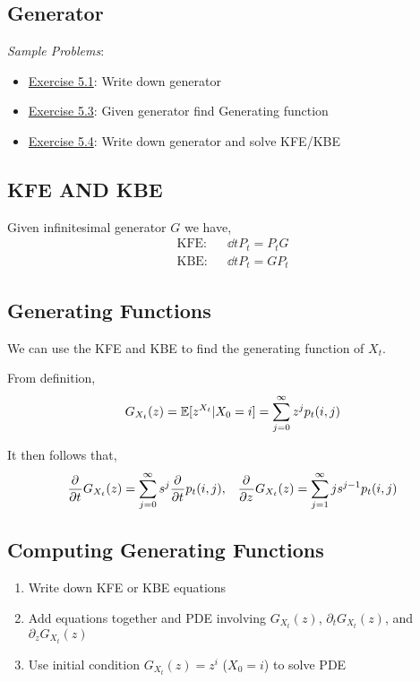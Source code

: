 \documentclass[12pt]{article}
\begin{document}
\subsection{Generator}
\textit{Sample Problems}: 
\begin{itemize}[nolistsep]
    \item \hyperref[Exercise 5.1]{Exercise 5.1}: Write down generator
    \item \hyperref[Exercise 5.3]{Exercise 5.3}: Given generator find Generating function
    \item \hyperref[Exercise 5.4]{Exercise 5.4}: Write down generator and solve KFE/KBE
\end{itemize}

\subsection{KFE AND KBE}
Given infinitesimal generator \( G \) we have,
\begin{align*}
    \text{KFE}: && \dd{}{t}P_t = P_t G \\
    \text{KBE}: && \dd{}{t}P_t = GP_t
\end{align*}

\subsection{Generating Functions}
We can use the KFE and KBE to find the generating function of \( X_t \).

From definition,
\begin{align*}
    G_{X_t}(z) = \mathbb{E}[z^{X_t} | X_0 = i] = \sum_{j=0}^{\infty} z^j p_t(i,j)
\end{align*}

It then follows that,
\begin{align*}
    \frac{\partial^{}}{\partial t^{}}G_{X_t}(z) = \sum_{j=0}^{\infty} s^j  \frac{\partial^{}}{\partial t^{}} p_{t}(i,j) 
    ,&&
    \frac{\partial^{}}{\partial z^{}}G_{X_t}(z) = \sum_{j=1}^{\infty} js^{j-1}p_t(i,j)
\end{align*}

\subsection{Computing Generating Functions}
\begin{enumerate}[nolistsep]
    \item Write down KFE or KBE equations
    \item Add equations together and PDE involving \( G_{X_t}(z) \), \( \partial_t G_{X_t}(z) \), and \( \partial_z G_{X_t}(z) \)
    \item Use initial condition \( G_{X_t}(z) = z^i \) (\(X_0 = i \)) to solve PDE
\end{enumerate}
\end{document}
